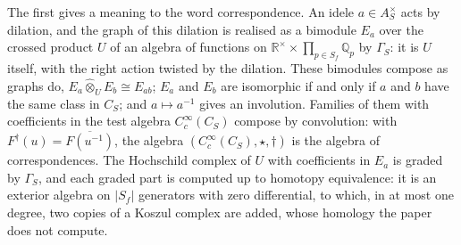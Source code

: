 \documentclass[10pt]{amsart}
\theoremstyle{definition}
\theoremstyle{remark}
\newcommand{\R}{\mathbb R}
\newcommand{\Q}{\mathbb Q}
\begin{document}
The first gives a meaning to the word correspondence. An idele $a\in A_S^\times$ acts by
dilation, and the graph of this dilation is realised as a bimodule $E_a$ over the crossed
product $U$ of an algebra of functions on $\R^\times\times\prod_{p\in S_f}\Q_p$ by $\Gamma_S$:
it is $U$ itself, with the right action twisted by the dilation. These bimodules compose as
graphs do, $E_a\widehat\otimes_UE_b\cong E_{ab}$; $E_a$ and $E_b$ are isomorphic if and only if
$a$ and $b$ have the same class in $C_S$; and $a\mapsto a^{-1}$ gives an involution. Families of
them with coefficients in the test algebra $C_c^\infty(C_S)$ compose by convolution: with
$F^\dagger(u)=\overline{F(u^{-1})}$, the algebra $(C_c^\infty(C_S),\star,\dagger)$ is the algebra
of correspondences. The Hochschild complex of $U$ with coefficients in $E_a$ is graded by
$\Gamma_S$, and each graded part is computed up to homotopy equivalence: it is an exterior
algebra on $|S_f|$ generators with zero differential, to which, in at most one degree, two
copies of a Koszul complex are added, whose homology the paper does not compute.
\end{document}
